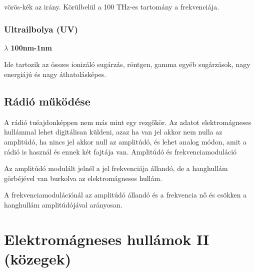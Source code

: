 \documentclass{article}
\begin{document}
vörös-kék az irány. Körülbelül a 100 THz-es tartomány a frekvenciája. 
\subsubsection{Ultrailbolya (UV)}
\textbf{$\lambda$ 100nm-1nm}

Ide tartozik az összes ionizáló sugárzás, röntgen, gamma egyéb sugárzások, nagy energiájú és nagy áthatolásképes. 
\subsection{Rádió működése}
A rádió tuéajdonképpen nem más mint egy rezgőkör.
Az adatot elektromágneses hullámmal lehet digitálisan küldeni, azaz ha van jel akkor nem nulla az amplitúdó, ha nincs jel akkor null az amplitúdó, és lehet analog módon, amit a rádió is használ és ennek két fajtája van. 
Amplitúdó és frekvenciamoduláció

Az amplitúdó modulált jelnél a jel frekvenciája állandó, de a hanghullám görbéjével van burkolva az elektromágneses hullám. 

A frekvenciamodulációnál az amplitúdó állandó és a frekvencia nő és csökken a hanghullám amplitúdójával arányosan. 
\newpage
\section{Elektromágneses hullámok II (közegek)}
\end{document}
